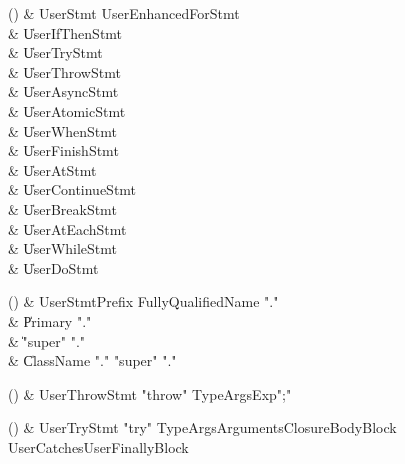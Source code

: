 \begin{bbgrammarappendix}{3.8in}

() & UserStmt \label{prod:UserStmt}  \:
         UserEnhancedForStmt \\
 &    \| UserIfThenStmt \\
 &    \| UserTryStmt \\
 &    \| UserThrowStmt \\
 &    \| UserAsyncStmt \\
 &    \| UserAtomicStmt \\
 &    \| UserWhenStmt \\
 &    \| UserFinishStmt \\
 &    \| UserAtStmt \\
 &    \| UserContinueStmt \\
 &    \| UserBreakStmt \\
 &    \| UserAtEachStmt \\
 &    \| UserWhileStmt \\
 &    \| UserDoStmt \\

\end{bbgrammarappendix}

\begin{bbgrammarappendix}{3.8in}

() & UserStmtPrefix \label{prod:UserStmtPrefix}  \:
         FullyQualifiedName \xcd"." \\
 &    \| Primary \xcd"." \\
 &    \| \xcd"super" \xcd"." \\
 &    \| ClassName \xcd"." \xcd"super" \xcd"." \\

\end{bbgrammarappendix}

\begin{bbgrammarappendix}{3.8in}

() & UserThrowStmt \label{prod:UserThrowStmt}  \:
 \xcd"throw" TypeArgs\opt Exp\opt \xcd";"

\end{bbgrammarappendix}

\begin{bbgrammarappendix}{3.8in}

() & UserTryStmt \label{prod:UserTryStmt}  \:
 \xcd"try" TypeArgs\opt Arguments\opt ClosureBodyBlock UserCatches\opt UserFinallyBlock\opt

\end{bbgrammarappendix}

